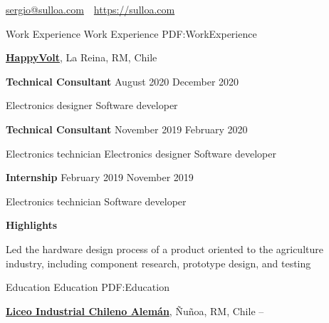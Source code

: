 \documentclass[letterpaper,yyyy,draft]{simpleresumecv}
\newcommand{\CVAuthor}{Sergio A. Ulloa B.}
\newcommand{\CVWebpage}{https://sulloa.com}
\begin{document}

\Title{\CVAuthor}

{
    \begin{SubTitle}
    \href{mailto:sergio@sulloa.com}{sergio@sulloa.com}
    \,\SubBulletSymbol\,
    \href{\CVWebpage}{\url{\CVWebpage}}
    \end{SubTitle}
}

\begin{Body}


\Section
{Work\newline
Experience}
{Work Experience}
{PDF:WorkExperience}
{
    \Entry
    \href{https://happyvolt.com/}{\textbf{HappyVolt}},
    La Reina, RM, Chile

    \BulletItem
    \textbf{Technical Consultant}
    \hfill
    August 2020
    December 2020
    \begin{Detail}
    \SubBulletItem
    Electronics designer
    \SubBulletItem
    Software developer
    \end{Detail}

    \BigGap
    \BulletItem
    \textbf{Technical Consultant}
    \hfill
    November 2019
    February 2020
    \begin{Detail}
    \SubBulletItem
    Electronics technician
    \SubBulletItem
    Electronics designer
    \SubBulletItem
    Software developer
    \end{Detail}

    \BigGap
    \BulletItem
    \textbf{Internship}
    \hfill
    February 2019
    November 2019
    \begin{Detail}
    \SubBulletItem
    Electronics technician
    \SubBulletItem
    Software developer
    \end{Detail}

    \BigGap
    \BulletItem
    \textbf{Highlights}
    \hfill
    \begin{Detail}
    \SubBulletItem
    Led the hardware design process of a product oriented to the agriculture industry, including component research, prototype design, and testing
    \end{Detail}
}


\Section
{Education}
{Education}
{PDF:Education}
{
    \Gap
    \Entry
    \href{https://www.lichan.cl/}{\textbf{Liceo Industrial Chileno Alemán}},
    Ñuñoa, RM, Chile
    \hfill
     -- 

}
\end{Body}
\end{document}
